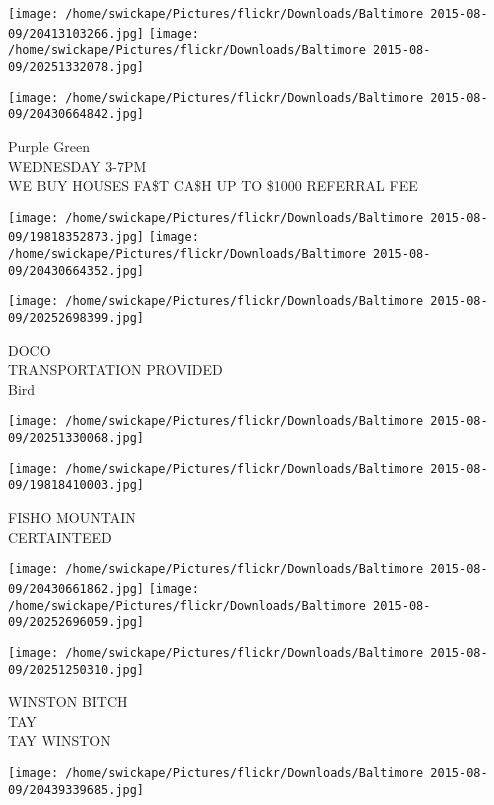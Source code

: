 \documentclass[10pt,letterpaper]{article}
\begin{document}
\texttt{[image: /home/swickape/Pictures/flickr/Downloads/Baltimore 2015-08-09/20413103266.jpg]}
\texttt{[image: /home/swickape/Pictures/flickr/Downloads/Baltimore 2015-08-09/20251332078.jpg]}

\vspace{0.25in}
\texttt{[image: /home/swickape/Pictures/flickr/Downloads/Baltimore 2015-08-09/20430664842.jpg]}

Purple Green\\
WEDNESDAY 3{-}7PM\\
WE BUY HOUSES FA\$T CA\$H UP TO \$1000 REFERRAL FEE\\
\pagebreak

\texttt{[image: /home/swickape/Pictures/flickr/Downloads/Baltimore 2015-08-09/19818352873.jpg]}
\texttt{[image: /home/swickape/Pictures/flickr/Downloads/Baltimore 2015-08-09/20430664352.jpg]}

\vspace{0.25in}
\texttt{[image: /home/swickape/Pictures/flickr/Downloads/Baltimore 2015-08-09/20252698399.jpg]}

DOCO\\
TRANSPORTATION PROVIDED\\
Bird\\
\pagebreak

\texttt{[image: /home/swickape/Pictures/flickr/Downloads/Baltimore 2015-08-09/20251330068.jpg]}

\vspace{0.25in}
\texttt{[image: /home/swickape/Pictures/flickr/Downloads/Baltimore 2015-08-09/19818410003.jpg]}

FISHO MOUNTAIN\\
CERTAINTEED\\
\pagebreak

\texttt{[image: /home/swickape/Pictures/flickr/Downloads/Baltimore 2015-08-09/20430661862.jpg]}
\texttt{[image: /home/swickape/Pictures/flickr/Downloads/Baltimore 2015-08-09/20252696059.jpg]}

\texttt{[image: /home/swickape/Pictures/flickr/Downloads/Baltimore 2015-08-09/20251250310.jpg]}

WINSTON BITCH\\
TAY\\
TAY WINSTON\\
\pagebreak

\texttt{[image: /home/swickape/Pictures/flickr/Downloads/Baltimore 2015-08-09/20439339685.jpg]}
\end{document}
